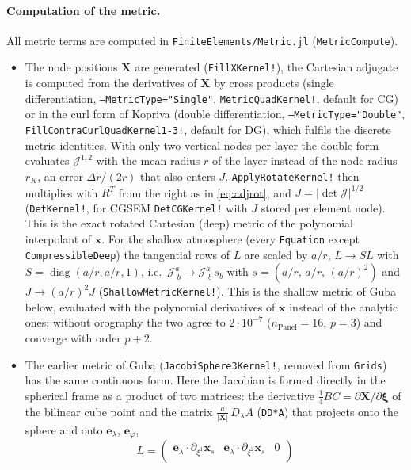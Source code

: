 \documentclass[11pt,a4paper]{article}
\newcommand{\Jm}{\mathcal{J}}
\newcommand{\code}[1]{\texttt{#1}}
\begin{document}
\paragraph{Computation of the metric.}
All metric terms are computed in \code{FiniteElements/Metric.jl}
(\code{MetricCompute}).
\begin{itemize}
\item The node positions $\bm X$ are generated
  (\code{FillXKernel!}), the Cartesian adjugate is computed from the
  derivatives of $\bm X$ by cross products (single differentiation,
  \code{--MetricType="Single"}, \code{MetricQuadKernel!}, default for CG) or
  in the curl form of Kopriva (double differentiation,
  \code{--MetricType="Double"}, \code{FillContraCurlQuadKernel1-3!}, default
  for DG), which fulfils the discrete metric identities. With only two
  vertical nodes per layer the double form evaluates $\Jm^{1,2}$ with the
  mean radius $\bar r$ of the layer instead of the node radius $r_K$, an
  error $\Delta r/(2r)$ that also enters $J$. \code{ApplyRotateKernel!} then multiplies with
  $R^T$ from the right as in \eqref{eq:adjrot}, and $J = |\det\Jm|^{1/2}$
  (\code{DetKernel!}, for CGSEM \code{DetCGKernel!} with $J$ stored per
  element node). This is the exact rotated Cartesian (deep) metric of the
  polynomial interpolant of $\bm x$. For the shallow atmosphere (every
  \code{Equation} except \code{CompressibleDeep}) the tangential rows of $L$
  are scaled by $a/r$, $L\to SL$ with $S = \operatorname{diag}(a/r,a/r,1)$,
  i.e.\ $\Jm^a_{\;b}\to\Jm^a_{\;b}\,s_b$ with $s = (a/r,\,a/r,\,(a/r)^2)$ and
  $J\to(a/r)^2J$ (\code{ShallowMetricKernel!}). This is the shallow metric of
  Guba below, evaluated with the polynomial derivatives of $\bm x$ instead of
  the analytic ones; without orography the two agree to $2\cdot10^{-7}$
  ($n_{\text{Panel}} = 16$, $p = 3$) and converge with order $p+2$.
\item The earlier metric of Guba (\code{JacobiSphere3Kernel!}, removed from
  \code{Grids}) has the same continuous form. Here the Jacobian is formed directly in the spherical frame as a product
  of two matrices: the derivative $\tfrac14 BC = \partial\bm X/\partial\bm\xi$
  of the bilinear cube point and the matrix
  $\tfrac{a}{|\bm X|}\,D_\lambda A$ (\code{DD*A}) that projects onto the sphere and onto
  $\bm e_\lambda$, $\bm e_\varphi$,
  \begin{equation}
    L = \begin{pmatrix}
      \bm e_\lambda\cdot\partial_{\xi^1}\bm x_s & \bm e_\lambda\cdot\partial_{\xi^2}\bm x_s & 0\\

\end{pmatrix}
\end{equation}
\end{itemize}
\end{document}
